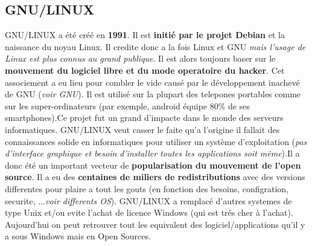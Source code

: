 \subsection{GNU/LINUX}

GNU/LINUX a été créé en \textbf{1991}. Il est \textbf{initié par le projet Debian} et la naissance du noyau Linux. Il credite donc a la fois Linux et GNU \textit{mais l'usage de Linux est plus connus au grand publique}. Il est alors toujours baser sur le \textbf{mouvement du logiciel libre et du mode operatoire du hacker}. 
Cet associement a eu lieu pour combler le vide causé par le développement inachevé de GNU (\textit{voir GNU}). Il est utilisé sur la plupart des telepones portables comme sur les super-ordinateurs (par exemple, android équipe 80\% de ses smartphones).Ce projet fut un grand d'impacte dans le monde des serveurs informatiques.
GNU/LINUX veut casser le faite qu'a l'origine il fallait des connaissances solide en informatiques pour utiliser un système d'exploitation (\textit{pas d'interface graphique et besoin d'installer toutes les applications soit même}).Il a donc été un important vecteur de \textbf{popularisation du mouvement de l'open source}.
Il a eu des \textbf{centaines de miliers de redistributions} avec des versions differentes pour plaire a tout les gouts (en fonction des besoins, configration, securite, ...\textit{voir differents OS}). GNU/LINUX a remplacé d'autres systemes de type Unix et/ou evite l'achat de licence Windows (qui est trés cher à l'achat). Aujourd'hui on peut retrouver tout les equivalent des logiciel/applications qu'il y a sous Windows mais en Open Sources.\newline
